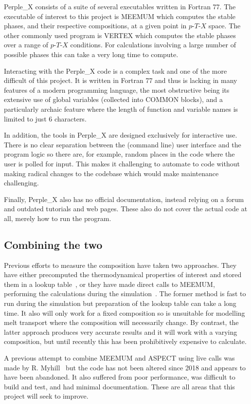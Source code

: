 Perple\_X consists of a suite of several executables written in Fortran 77.
The executable of interest to this project is MEEMUM which computes the stable phases, and their respective compositions, at a given point in $p$-$T$-$X$ space.
The other commonly used program is VERTEX which computes the stable phases over a range of $p$-$T$-$X$ conditions.
For calculations involving a large number of possible phases this can take a very long time to compute.

Interacting with the Perple\_X code is a complex task and one of the more difficult of this project.
It is written in Fortran 77 and thus is lacking in many features of a modern programming language, the most obstructive being its extensive use of global variables (collected into COMMON blocks), and a particularly archaic feature where the length of function and variable names is limited to just 6 characters.

In addition, the tools in Perple\_X are designed exclusively for interactive use.
There is no clear separation between the (command line) user interface and the program logic so there are, for example, random places in the code where the user is polled for input.
This makes it challenging to automate to code without making radical changes to the codebase which would make maintenance challenging.

Finally, Perple\_X also has no official documentation, instead relying on a forum and outdated tutorials and web pages.
These also do not cover the actual code at all, merely how to run the program.

\subsection{Combining the two}

Previous efforts to measure the composition have taken two approaches.
They have either precomputed the thermodynamical properties of interest and stored them in a lookup table~\parencite[e.g.][]{magniDeepWaterRecycling2014,bouilholNumericalApproachMelting2015,freeburnNumericalModelsMagmatic2017}, or they have made direct calls to MEEMUM, performing the calculations during the simulation~\parencite[e.g.][]{kaislaniemiLithosphereDestabilizationMelt2018}.
The former method is fast to run during the simulation but preparation of the lookup table can take a long time. 
It also will only work for a fixed composition so is unsuitable for modelling melt transport where the composition will necessarily change.
By contrast, the latter approach produces very accurate results and it will work with a varying composition, but until recently this has been prohibitively expensive to calculate.

A previous attempt to combine MEEMUM and ASPECT using live calls was made by R. Myhill~\parencite*{myhill_perplex_2018} but the code has not been altered since 2018 and appears to have been abandoned. It also suffered from poor performance, was difficult to build and test, and had minimal documentation.
These are all areas that this project will seek to improve.